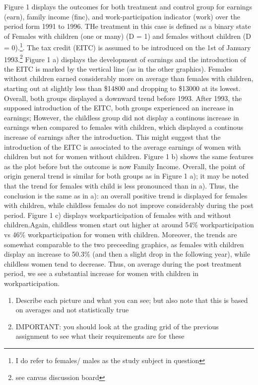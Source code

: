 \documentclass[a4paper]{article}
\begin{document}
Figure 1 displays the outcomes for both treatment and control group for earnings (earn), family income (finc), and work-participation indicator (work) over the period form 1991 to 1996. THe treatment in this case is defined as a binary state of Females with children (one or many) (D = 1) and females without children (D = 0).\footnote{I do refer to females/ males as the study subject in question}. The tax credit (EITC) is assumed to be introduced on the 1st of January 1993.\footnote{see canvas discussion board}
\indent Figure 1 a) displays the development of earnings and the introduction of the EITC is marked by the vertical line (as in the other graphics). Females without children earned considerably more on average than females with children, starting out at slightly less than \$14800 and dropping to \$13000 at its lowest. Overall, both groups displayed a downward trend before 1993. After 1993, the supposed introduction of the EITC, both groups experienced an increase in earnings; However, the childless group did not display a continous increase in earnings when compared to females with children, which displayed a continous increase of earnings after the introduction. This might suggest that the introduction of the  EITC is associated to the average earnings of women with children but not for women without children.
\indent Figure 1 b) shows the same features as the plot before but the outcome is now Family Income. Overall, the point of origin general trend is similar for both groups as in Figure 1 a); it may be noted that the trend for females with child is less pronounced than in a). Thus, the conclusion is the same as in a): an overall positive trend is displayed for females with children, while childless females do not improve considerably during the post period. 
\indent Figure 1 c) displays workparticipation of females with and without children.Again, childless women start out higher at around 54\% workparticipation vs 46\% workparticipation for women with children. Moreover, the trends are somewhat comparable to the two preceeding graphics, as females with children display an increase to 50.3\% (and then a slight drop in the following year), while childless women tend to decrease. Thus, on average during the post treatment period, we see a substantial increase for women with children in workparticipation.






\begin{enumerate}
   \item Describe each picture and what you can see; but also note that this is based on averages and not statistically true
   \item IMPORTANT: you should look at the grading grid of the previous assignment to see what their requirements are for these
\end{enumerate}
\end{document}
